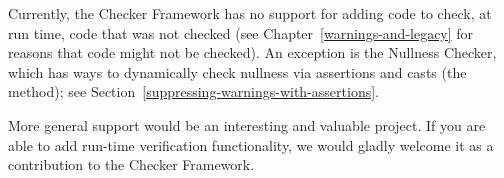 Currently, the Checker Framework has no support for adding code to check,
at run time, code that was not checked (see
Chapter~\ref{warnings-and-legacy} for reasons that code might not be
checked).  An exception is the Nullness Checker, which has ways to
dynamically check nullness via assertions and casts (the
 method); see
Section~\ref{suppressing-warnings-with-assertions}.

More general support would be an interesting and valuable project.  If you
are able to add run-time verification functionality, we would gladly
welcome it as a contribution to the Checker Framework.


